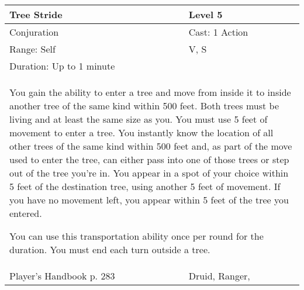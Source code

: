 \documentclass[11pt]{report}
\begin{document}
\begin{table}[H]
	\begin{tabular}{||p{6cm}|p{6cm}||}
		\hline\hline
		\bf{Tree Stride} & Level 5\\ \hline
		Conjuration & Cast: 1 Action\\ \hline
		Range: Self & V, S\\ \hline
		Duration: Up to 1 minute & \\ \hline
		\multicolumn{2}{||p{12cm}||}{You gain the ability to enter a tree and move from inside it to inside another tree of the same kind within 500 feet.
Both trees must be living and at least the same size as you. You must use 5 feet of movement to enter a tree. You instantly know the location of all other trees of the same kind within 500 feet and, as part of the move used to enter the tree, can either pass into one of those trees or step out of the tree you’re in. You appear in a spot of your choice within 5 feet of the destination tree, using another 5 feet of movement. If you have no movement left, you appear within 5 feet of the tree you entered.

You can use this transportation ability once per round for the duration. You must end each turn outside a tree.}\\ \hline
Player's Handbook p. 283 & Druid, Ranger, \\ \hline\hline
	\end{tabular}
\end{table}
\end{document}
